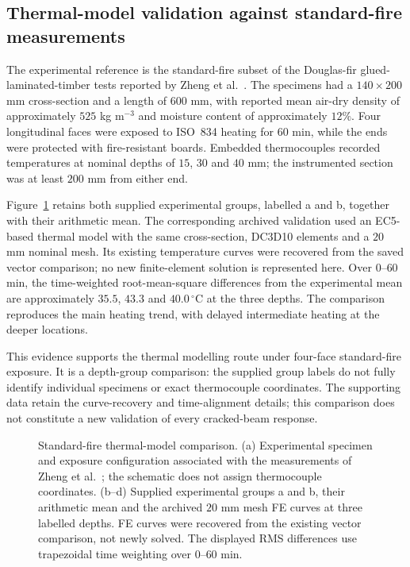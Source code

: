 \subsection{Thermal-model validation against standard-fire measurements}
\label{sec:experimental-validation}

The experimental reference is the standard-fire subset of the Douglas-fir glued-laminated-timber tests reported by Zheng et al.\ \citep{zheng2026largespace}. The specimens had a $140\times200$ mm cross-section and a length of $600$ mm, with reported mean air-dry density of approximately $525$ kg m$^{-3}$ and moisture content of approximately $12\%$. Four longitudinal faces were exposed to ISO~834 heating for $60$ min, while the ends were protected with fire-resistant boards. Embedded thermocouples recorded temperatures at nominal depths of $15$, $30$ and $40$ mm; the instrumented section was at least $200$ mm from either end.

Figure~\ref{fig:experimental-validation} retains both supplied experimental groups, labelled a and b, together with their arithmetic mean. The corresponding archived validation used an EC5-based thermal model with the same cross-section, DC3D10 elements and a $20$ mm nominal mesh. Its existing temperature curves were recovered from the saved vector comparison; no new finite-element solution is represented here. Over $0$--$60$ min, the time-weighted root-mean-square differences from the experimental mean are approximately $35.5$, $43.3$ and $40.0\,{}^\circ$C at the three depths. The comparison reproduces the main heating trend, with delayed intermediate heating at the deeper locations.

This evidence supports the thermal modelling route under four-face standard-fire exposure. It is a depth-group comparison: the supplied group labels do not fully identify individual specimens or exact thermocouple coordinates. The supporting data retain the curve-recovery and time-alignment details; this comparison does not constitute a new validation of every cracked-beam response.

\begin{figure}[!htbp]
\centering
{}
\caption{Standard-fire thermal-model comparison. (a) Experimental specimen and exposure configuration associated with the measurements of Zheng et al.\ \citep{zheng2026largespace}; the schematic does not assign thermocouple coordinates. (b--d) Supplied experimental groups a and b, their arithmetic mean and the archived $20$ mm mesh FE curves at three labelled depths. FE curves were recovered from the existing vector comparison, not newly solved. The displayed RMS differences use trapezoidal time weighting over $0$--$60$ min.}
\label{fig:experimental-validation}
\end{figure}
